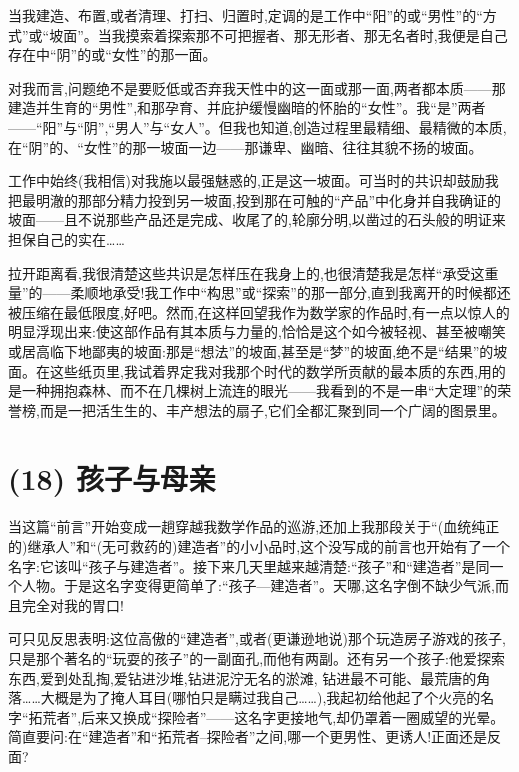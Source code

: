  当我建造、布置,或者清理、打扫、归置时,定调的是工作中“阳”的或“男性”的“方式”或“坡面”。当我摸索着探索那不可把握者、那无形者、那无名者时,我便是自己存在中“阴”的或“女性”的那一面。

对我而言,问题绝不是要贬低或否弃我天性中的这一面或那一面,两者都本质——那建造并生育的“男性”,和那孕育、并庇护缓慢幽暗的怀胎的“女性”。我“是”两者——“阳”与“阴”,“男人”与“女人”。但我也知道,创造过程里最精细、最精微的本质,在“阴”的、“女性”的那一坡面一边——那谦卑、幽暗、往往其貌不扬的坡面。

工作中始终(我相信)对我施以最强魅惑的,正是这一坡面。可当时的共识却鼓励我把最明澈的那部分精力投到另一坡面,投到那在可触的“产品”中化身并自我确证的坡面——且不说那些产品还是完成、收尾了的,轮廓分明,以凿过的石头般的明证来担保自己的实在……

拉开距离看,我很清楚这些共识是怎样压在我身上的,也很清楚我是怎样“承受这重量”的——柔顺地承受!我工作中“构思”或“探索”的那一部分,直到我离开的时候都还被压缩在最低限度,好吧。然而,在这样回望我作为数学家的作品时,有一点以惊人的明显浮现出来:使这部作品有其本质与力量的,恰恰是这个如今被轻视、甚至被嘲笑或居高临下地鄙夷的坡面:那是“想法”的坡面,甚至是“梦”的坡面,绝不是“结果”的坡面。在这些纸页里,我试着界定我对我那个时代的数学所贡献的最本质的东西,用的是一种拥抱森林、而不在几棵树上流连的眼光——我看到的不是一串“大定理”的荣誉榜,而是一把活生生的、丰产想法的扇子,它们全都汇聚到同一个广阔的图景里。

\section{(18) 孩子与母亲}

当这篇“前言”开始变成一趟穿越我数学作品的巡游,还加上我那段关于“(血统纯正的)继承人”和“(无可救药的)建造者”的小小品时,这个没写成的前言也开始有了一个名字:它该叫“孩子与建造者”。接下来几天里越来越清楚:“孩子”和“建造者”是同一个人物。于是这名字变得更简单了:“孩子—建造者”。天哪,这名字倒不缺少气派,而且完全对我的胃口!

可只见反思表明:这位高傲的“建造者”,或者(更谦逊地说)那个玩造房子游戏的孩子,只是那个著名的“玩耍的孩子”的一副面孔,而他有两副。还有另一个孩子:他爱探索东西,爱到处乱掏,爱钻进沙堆,钻进泥泞无名的淤滩,
 钻进最不可能、最荒唐的角落……大概是为了掩人耳目(哪怕只是瞒过我自己……),我起初给他起了个火亮的名字“拓荒者”,后来又换成“探险者”——这名字更接地气,却仍罩着一圈威望的光晕。简直要问:在“建造者”和“拓荒者–探险者”之间,哪一个更男性、更诱人!正面还是反面?

